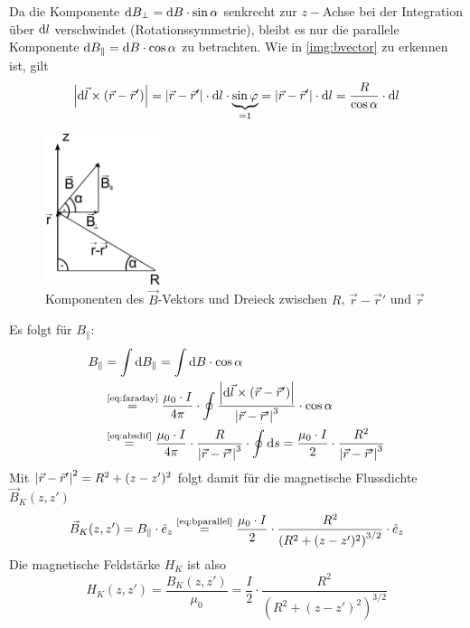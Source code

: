 Da die Komponente $\mathrm{d} B_\perp = \mathrm{d} B \cdot \sin \alpha$ senkrecht zur $z-$Achse bei der Integration über $\mathrm{d} l$ verschwindet 
(Rotationssymmetrie), bleibt es nur die parallele Komponente $\mathrm{d} B_\parallel = \mathrm{d} B \cdot \cos \alpha$ zu betrachten. Wie in 
\autoref{img:bvector} zu erkennen ist, gilt
\begin{equation}
\label{eq:absdif}
  \left|\mathrm{d} \vec{l} \times \left( \vec{r} - \vec{r}' \right)\right| = \left|\vec{r} - \vec{r}'\right| \cdot \mathrm{d} l \cdot \underbrace{\sin \varphi}_{= 1} 
  = \left|\vec{r} - \vec{r}'\right| \cdot \mathrm{d} l = \frac{R}{\cos \alpha} \cdot \mathrm{d} l
\end{equation}
\begin{figure}[H]
\begin{center}
  \includegraphics[width=0.3\textwidth]{../img/bvector.pdf}
  \caption{Komponenten des $\vec{B}$-Vektors und Dreieck zwischen $R$, $\vec{r}-\vec{r}'$ und $\vec{r}$}
  \label{img:bvector}
\end{center}
\end{figure}
Es folgt für $B_\parallel$:
\begin{equation}
\begin{split}
  \label{eq:bparallel}
    B_\parallel &= \int \difd B_\parallel = \int \difd B \cdot \cos \alpha \\
  &\refeq{eq:faraday} \frac{\mu_0 \cdot I}{4 \pi} \cdot \oint \frac{\abs{\difd \vec{l} \times \left( \vec{r} - \vec{r}' \right)}}{\abs{\vec{r} - \vec{r}'}^3} \cdot \cos \alpha \\
  &\refeq{eq:absdif} \frac{\mu_0 \cdot I}{4 \pi} \cdot \frac{R}{\abs{\vec{r} - \vec{r}'}^3} \cdot \oint \difd s = \frac{\mu_0 \cdot I}{2} \cdot \frac{R^2}{\abs{\vec{r} - \vec{r}'}^3}
\end{split}
\end{equation}
Mit $\left|\vec{r} - \vec{r}'\right|^2 = R^2 + (z-z')^2$ folgt damit für die magnetische Flussdichte $\vec{B}_K(z, z')$
\begin{equation}
  \vec{B}_K(z, z') = B_\parallel \cdot \hat{e}_z \refeq{eq:bparallel} \frac{\mu_0 \cdot I}{2} \cdot \frac{R^2}{ \left( R^2 + (z-z')^2 \right)^{3/2}} \cdot \hat{e}_z
\end{equation}
Die magnetische Feldstärke $H_K$ ist also
\begin{equation}
  H_K(z, z') = \frac{B_K(z, z')}{\mu_0} = \frac{I}{2} \cdot \frac{R^2}{ \left( R^2 + (z-z')^2 \right)^{3/2}}
\end{equation}
